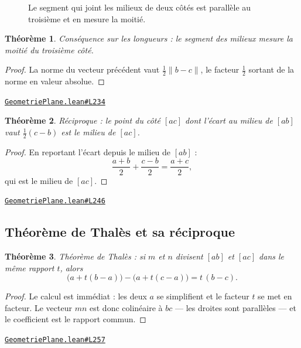 \documentclass[11pt,a4paper]{article}
\theoremstyle{definition}
\theoremstyle{plain}
\newtheorem{theoreme}{Théorème}
\newcommand{\source}[2]{\par\smallskip\noindent\hfill{\footnotesize\href{#1}{\texttt{#2}}}\par\smallskip}
\begin{document}
\begin{figure}[h]
\centering

\caption{Le segment qui joint les milieux de deux côtés est parallèle au troisième et en mesure la moitié.}
\end{figure}

\begin{theoreme}
Conséquence sur les longueurs : le segment des milieux mesure la moitié du troisième
côté.
\end{theoreme}

\begin{proof}
La norme du vecteur précédent vaut $\tfrac12\|b - c\|$, le facteur $\tfrac12$ sortant de
la norme en valeur absolue.
\end{proof}
\source{https://github.com/Commutator-IO/learn-lean/blob/main/courses/01-college/02-geometrie-plane/GeometriePlane.lean\#L234}{GeometriePlane.lean\#L234}

\begin{theoreme}
Réciproque : le point du côté $[ac]$ dont l'écart au milieu de $[ab]$ vaut
$\tfrac12(c-b)$ est le milieu de $[ac]$.
\end{theoreme}

\begin{proof}
En reportant l'écart depuis le milieu de $[ab]$ :
\[ \frac{a+b}{2} + \frac{c-b}{2} = \frac{a+c}{2} , \]
qui est le milieu de $[ac]$.
\end{proof}
\source{https://github.com/Commutator-IO/learn-lean/blob/main/courses/01-college/02-geometrie-plane/GeometriePlane.lean\#L246}{GeometriePlane.lean\#L246}

\subsection{Théorème de Thalès et sa réciproque}

\begin{theoreme}
Théorème de Thalès : si $m$ et $n$ divisent $[ab]$ et $[ac]$ dans le même rapport $t$,
alors
\[ \bigl(a + t(b-a)\bigr) - \bigl(a + t(c-a)\bigr) = t\,(b - c) . \]
\end{theoreme}

\begin{proof}
Le calcul est immédiat : les deux $a$ se simplifient et le facteur $t$ se met en
facteur. Le vecteur $mn$ est donc colinéaire à $bc$ — les droites sont parallèles — et le
coefficient est le rapport commun.
\end{proof}
\source{https://github.com/Commutator-IO/learn-lean/blob/main/courses/01-college/02-geometrie-plane/GeometriePlane.lean\#L257}{GeometriePlane.lean\#L257}
\end{document}
